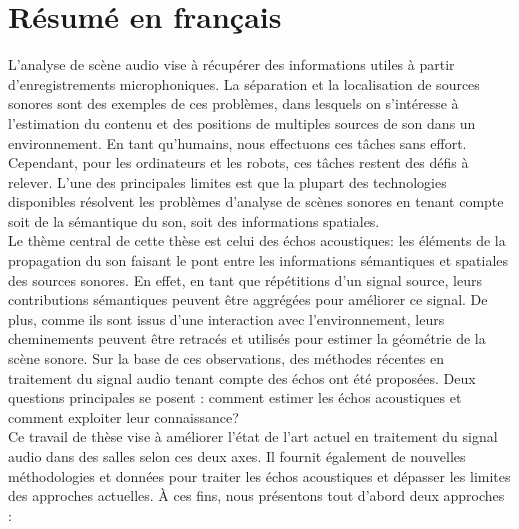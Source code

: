 \chapter*{Résumé en français}


    L'analyse
     de scène audio vise à récupérer des informations utiles à partir d'enregistrements microphoniques.
    La séparation et la localisation de sources sonores sont des exemples de ces problèmes, dans lesquels on s'intéresse à l'estimation du contenu et des positions de multiples sources de son dans un environnement.
    En tant qu'humains, nous effectuons ces tâches sans effort.
    Cependant, pour les ordinateurs et les robots, ces tâches restent des défis à relever.
    L'une des principales limites est que la plupart des technologies disponibles résolvent les problèmes d'analyse de scènes sonores en tenant compte soit de la sémantique du son, soit des informations spatiales.
    \\Le thème central de cette thèse est celui des échos acoustiques: les éléments de la propagation du son faisant le pont entre les informations sémantiques et spatiales des sources sonores.
    En effet, en tant que répétitions d'un signal source, leurs contributions sémantiques peuvent être aggrégées pour améliorer ce signal.
    De plus, comme ils sont issus d'une interaction avec l'environnement, leurs cheminements peuvent être retracés et utilisés pour estimer la géométrie de la scène sonore.
    Sur la base de ces observations, des méthodes récentes en traitement du signal audio tenant compte des échos ont été proposées.
    Deux questions principales se posent : comment estimer les échos acoustiques et comment exploiter leur connaissance?
    \\Ce travail de thèse vise à améliorer l'état de l'art actuel en traitement du signal audio dans des salles selon ces deux axes.
    Il fournit également de nouvelles méthodologies et données pour traiter les échos acoustiques et dépasser les limites des approches actuelles.
    À ces fins, nous présentons tout d'abord deux approches :

